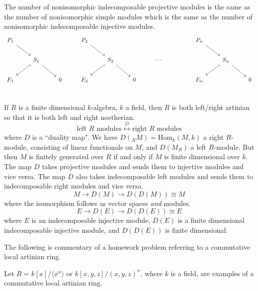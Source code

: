 \begin{rem}
The number of nonisomorphic indecomposable projective modules is the same as the number of nonisomorphic simple modules which is the same as the number of nonisomorphic indecomposable injective modules.
\[
\begin{tikzcd}
P_1 \arrow{dr} &          &     &   P_2 \arrow{dr} &              &      &             &    & P_n \arrow{dr}    &             &       \\
        &  S_1 \arrow{dr} \arrow[hookrightarrow]{dl}  &     &          &   S_2 \arrow{dr} \arrow[hookrightarrow]{dl}     &      &  \cdots  &    &             & S_n \arrow{dr} \arrow[hookrightarrow]{dl}      &       \\   
E_1 &    &   0      &   E_2 &              &  0   &             &    & E_n     &             & 0      \\ 
\end{tikzcd}
\]
\end{rem}

\begin{rem}
If $R$ is a finite dimensional $k$-algebra, $k$ a field, then $R$ is both left/right artinian so that it is both left and right noetherian.
\[
\text{left }R\text{ modules} \stackrel{D}{\longleftrightarrow} \text{right }R\text{ modules}
\]
where $D$ is a ``duality map". We have $D(_R M)=\text{Hom}_k(M,k)$ a right $R$-module, consisting of linear functionals on $M$, and $D(M_R)$ a left $R$-module. But then $M$ is finitely generated over $R$ if and only if $M$ is finite dimensional over $k$. The map $D$ takes projective modules and sends them to injective modules and vice versa. The map $D$ also takes indecomposable left modules and sends them to indecomposable right modules and vice versa.
\[
M \longrightarrow D(M) \longrightarrow D(D(M)) \cong M
\]
where the isomorphism follows as vector spaces \emph{and} modules. 
\[
E \longrightarrow D(E) \longrightarrow D(D(E)) \cong E
\]
where $E$ is an indecomposable injective module, $D(E)$ is a finite dimensional indecomposable injective module, and $D(D(E))$ is finite dimensional. 
\end{rem}

The following is commentary of a homework problem referring to a commutative local artinian ring.

\begin{ex}
Let $R=k[x]/\langle x^n \rangle$ or $k[x,y,z]/(x,y,z)^n$, where $k$ is a field, are examples of a commutative local artinian ring.
\end{ex}

